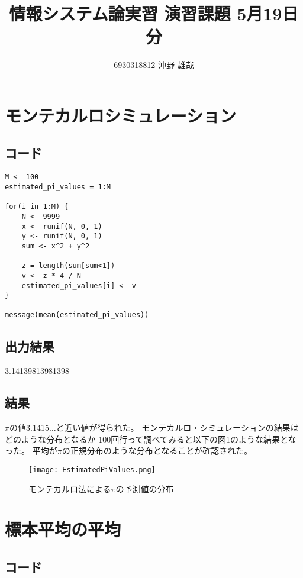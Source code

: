 \documentclass{jsarticle}
\begin{document}
\title{情報システム論実習 演習課題 5月19日分}
\author{6930318812 沖野 雄哉}
\maketitle

\section{モンテカルロシミュレーション}

\subsection{コード}
\begin{lstlisting}[caption=MonteCarlo.R]
M <- 100
estimated_pi_values = 1:M

for(i in 1:M) {
    N <- 9999
    x <- runif(N, 0, 1)
    y <- runif(N, 0, 1)
    sum <- x^2 + y^2

    z = length(sum[sum<1])
    v <- z * 4 / N
    estimated_pi_values[i] <- v
}

message(mean(estimated_pi_values))
\end{lstlisting}

\subsection{出力結果}
3.14139813981398

\subsection{結果}
$\pi$の値3.1415$\ldots$と近い値が得られた。
モンテカルロ・シミュレーションの結果はどのような分布となるか
100回行って調べてみると以下の図1のような結果となった。
平均が$\pi$の正規分布のような分布となることが確認された。

\newpage

\begin{figure}[h]
    \centering
    \caption[モンテカルロ法による$\pi$の予測値の分布]{モンテカルロ法による$\pi$の予測値の分布}
    \texttt{[image: EstimatedPiValues.png]}
\end{figure}

\newpage

\section{標本平均の平均}

\subsection{コード}
\end{document}
